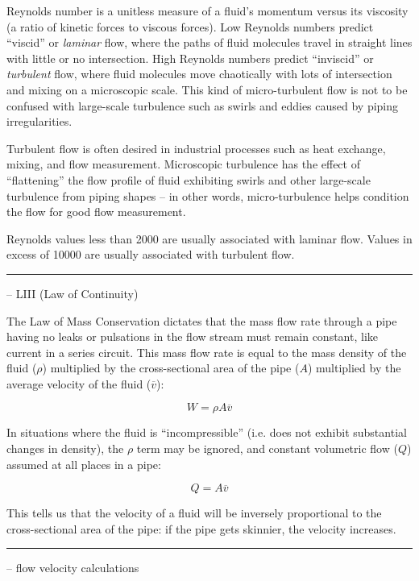 Reynolds number is a unitless measure of a fluid's momentum versus its viscosity (a ratio of kinetic forces to viscous forces).  Low Reynolds numbers predict ``viscid'' or {\it laminar} flow, where the paths of fluid molecules travel in straight lines with little or no intersection.  High Reynolds numbers predict ``inviscid'' or {\it turbulent} flow, where fluid molecules move chaotically with lots of intersection and mixing on a microscopic scale.  This kind of micro-turbulent flow is not to be confused with large-scale turbulence such as swirls and eddies caused by piping irregularities.

\vskip 10pt

Turbulent flow is often desired in industrial processes such as heat exchange, mixing, and flow measurement.  Microscopic turbulence has the effect of ``flattening'' the flow profile of fluid exhibiting swirls and other large-scale turbulence from piping shapes -- in other words, micro-turbulence helps condition the flow for good flow measurement.

\vskip 10pt

Reynolds values less than 2000 are usually associated with laminar flow.  Values in excess of 10000 are usually associated with turbulent flow.


\filbreak \vskip 5pt \hrule \vskip 5pt  -- LIII (Law of Continuity) \vskip 10pt

The Law of Mass Conservation dictates that the mass flow rate through a pipe having no leaks or pulsations in the flow stream must remain constant, like current in a series circuit.  This mass flow rate is equal to the mass density of the fluid ($\rho$) multiplied by the cross-sectional area of the pipe ($A$) multiplied by the average velocity of the fluid ($\overline{v}$):

$$W = \rho A \overline{v}$$

In situations where the fluid is ``incompressible'' (i.e. does not exhibit substantial changes in density), the $\rho$ term may be ignored, and constant volumetric flow ($Q$) assumed at all places in a pipe:

$$Q = A \overline{v}$$

This tells us that the velocity of a fluid will be inversely proportional to the cross-sectional area of the pipe: if the pipe gets skinnier, the velocity increases.


\filbreak \vskip 5pt \hrule \vskip 5pt  -- flow velocity calculations \vskip 10pt

